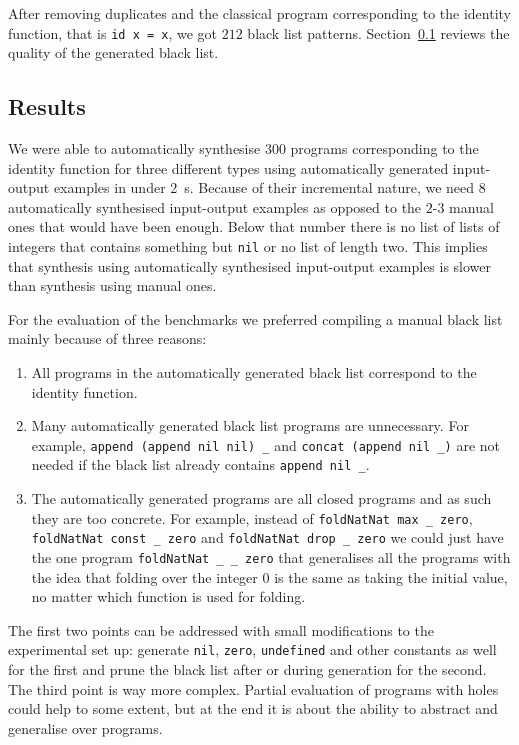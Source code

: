 After removing duplicates and the classical program corresponding to the identity function, that is \lstinline?id x = x?, we got $212$ black list patterns. Section~\ref{Automatic black list} reviews the quality of the generated black list.


\subsection{Results}\label{Automatic black list}
We were able to automatically synthesise $300$ programs corresponding to the identity function for three different types using automatically generated input-output examples in under \SI{2}{s}. Because of their incremental nature, we need $8$ automatically synthesised input-output examples as opposed to the $2$-$3$ manual ones that would have been enough. Below that number there is no list of lists of integers that contains something but \lstinline?nil? or no list of length two. This implies that synthesis using automatically synthesised input-output examples is slower than synthesis using manual ones.

For the evaluation of the benchmarks we preferred compiling a manual black list mainly because of three reasons: 
\begin{enumerate}
\item All programs in the automatically generated black list correspond to the identity function.
\item Many automatically generated black list programs are unnecessary. For example, \lstinline?append (append nil nil) _? and \lstinline?concat (append nil _)? are not needed if the black list already contains \lstinline?append nil _?.
\item The automatically generated programs are all closed programs and as such they are too concrete. For example, instead of \lstinline?foldNatNat max _ zero?, \lstinline?foldNatNat const _ zero? and \lstinline?foldNatNat drop _ zero? we could just have the one program \lstinline?foldNatNat _ _ zero? that generalises all the programs with the idea that folding over the integer $0$ is the same as taking the initial value, no matter which function is used for folding.
\end{enumerate}

The first two points can be addressed with small modifications to the experimental set up: generate \lstinline?nil?, \lstinline?zero?, \lstinline?undefined? and other constants as well for the first and prune the black list after or during generation for the second.
The third point is way more complex. Partial evaluation of programs with holes could help to some extent, but at the end it is about the ability to abstract and generalise over programs.


